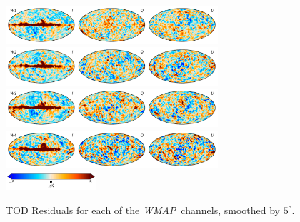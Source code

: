 \documentclass[twocolumn]{../../common/aa}
\def\WMAP{\emph{WMAP}}
\begin{document}
\begin{figure}
	\includegraphics[width=0.7\textwidth]{figures/tod_res_W1_IQU.pdf}\\
	\includegraphics[width=0.7\textwidth]{figures/tod_res_W2_IQU.pdf}\\
	\includegraphics[width=0.7\textwidth]{figures/tod_res_W3_IQU.pdf}\\
	\includegraphics[width=0.7\textwidth]{figures/tod_res_W4_IQU.pdf}\\
	\includegraphics[width=0.30\textwidth]{figures/cbar_5uK.pdf}
	\caption{TOD Residuals for each of the \WMAP\ channels, smoothed by $5^\circ$.}
        \label{fig:todres}
\end{figure}
\end{document}
